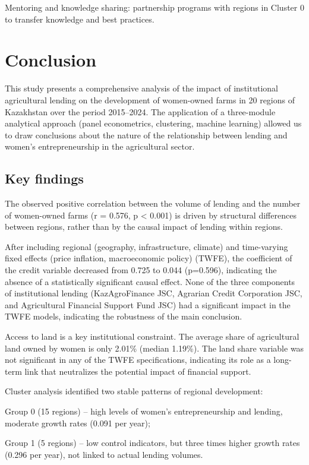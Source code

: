 \documentclass[pdflatex,sn-mathphys-ay]{sn-jnl}
\begin{document}
Mentoring and knowledge sharing: partnership programs with regions in
Cluster 0 to transfer knowledge and best practices.

\section{Conclusion}

This study presents a comprehensive analysis of the impact of
institutional agricultural lending on the development of women-owned
farms in 20 regions of Kazakhstan over the period 2015--2024. The
application of a three-module analytical approach (panel econometrics,
clustering, machine learning) allowed us to draw conclusions about the
nature of the relationship between lending and women's entrepreneurship
in the agricultural sector.

\subsection{Key findings}

The observed positive correlation between the volume of lending and the
number of women-owned farms (r = 0.576, p \textless{} 0.001) is driven
by structural differences between regions, rather than by the causal
impact of lending within regions.

After including regional (geography, infrastructure, climate) and
time-varying fixed effects (price inflation, macroeconomic policy)
(TWFE), the coefficient of the credit variable decreased from 0.725 to
0.044 (p=0.596), indicating the absence of a statistically significant
causal effect. None of the three components of institutional lending
(KazAgroFinance JSC, Agrarian Credit Corporation JSC, and Agricultural
Financial Support Fund JSC) had a significant impact in the TWFE models,
indicating the robustness of the main conclusion.

Access to land is a key institutional constraint. The average share of
agricultural land owned by women is only 2.01\% (median 1.19\%). The
land share variable was not significant in any of the TWFE
specifications, indicating its role as a long-term link that neutralizes
the potential impact of financial support.

Cluster analysis identified two stable patterns of regional development:

Group 0 (15 regions) -- high levels of women's entrepreneurship and
lending, moderate growth rates (0.091 per year);

Group 1 (5 regions) -- low control indicators, but three times higher
growth rates (0.296 per year), not linked to actual lending volumes.
\end{document}

